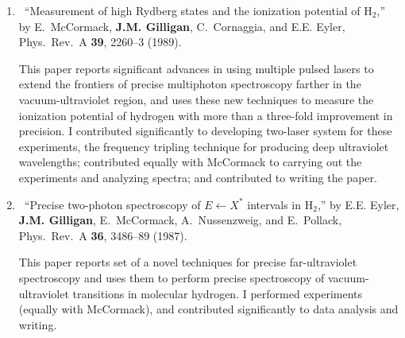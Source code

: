 \begin{enumerate}
\begin{credit}
	  \end{credit}
%	
	\item
	\textdagger\ 
	\enquote{Measurement of high Rydberg states and the ionization potential of
	  {H$_2$},}  by E.~McCormack, \textbf{J.M. Gilligan}, C.~Cornaggia, and E.E. Eyler,
	  Phys.\ Rev.\ A \textbf{39}, 2260--3 (1989). 
	  \begin{credit}
	  This paper reports significant advances in using multiple pulsed lasers to extend the frontiers of precise multiphoton spectroscopy farther in the vacuum-ultraviolet region, and uses these new techniques to measure the ionization potential of hydrogen with more than a three-fold improvement in precision. I contributed significantly to developing two-laser system for these experiments, the frequency tripling technique for producing deep ultraviolet wavelengths; contributed equally with McCormack to carrying out the experiments and analyzing spectra; and contributed to writing the paper.
	  \end{credit}
%	
\iffalse
	\item
	\textdagger\ 
	\enquote{Precise photodissociation and multiphoton spectroscopy of $\H_2$,  by E.F. McCormack, E.E. Eyler, and \textbf{J.M. Gilligan}, J. Opt. Soc. B Opt. Phys. \textbf{4}, 80 (1987).  
	  \begin{credit}
	  This paper reports set of a novel techniques for precise far-ultraviolet spectroscopy and uses them to perform precise spectroscopy of vacuum-ultraviolet transitions in molecular hydrogen. I performed experiments (equally with McCormack), and contributed significantly to data analysis and writing.
	  \end{credit} 
\fi
%	
	\item
	\textdagger\ 
	\enquote{Precise two-photon spectroscopy of {$E\leftarrow X^*$} intervals in
	  {H$_2$},}  by E.E. Eyler, \textbf{J.M. Gilligan}, E.~McCormack, A.~Nussenzweig, and
	  E.~Pollack, Phys.\ Rev.\ A \textbf{36}, 3486--89 (1987).  
	  \begin{credit}
	  This paper reports set of a novel techniques for precise far-ultraviolet spectroscopy and uses them to perform precise spectroscopy of vacuum-ultraviolet transitions in molecular hydrogen. I performed experiments (equally with McCormack), and contributed significantly to data analysis and writing.
	  \end{credit} 
%
\end{enumerate}


